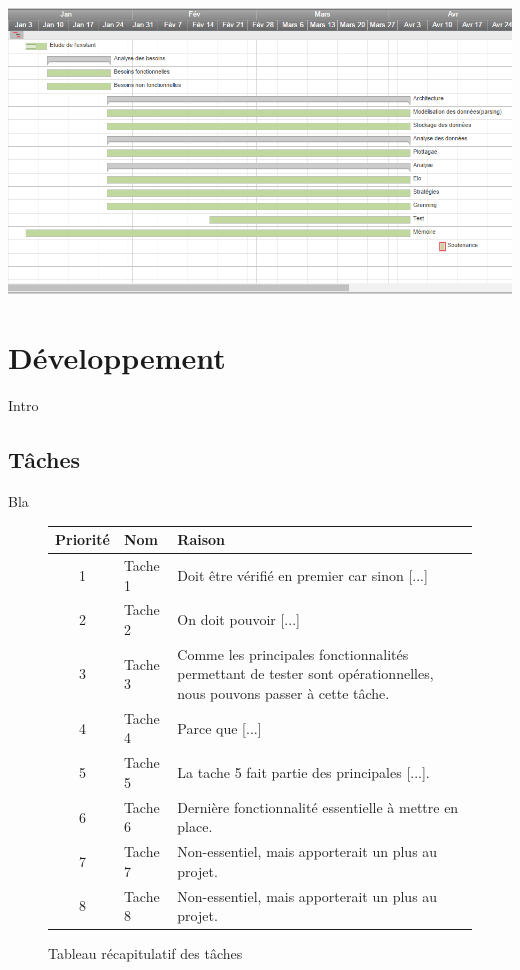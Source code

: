 \includegraphics[scale=0.45,keepaspectratio]{gantt}\\

\newpage

\section{Développement}

Intro

\subsection{Tâches}

Bla\\


\begin{figure}[!h]
\begin{center}
\begin{tabularx}{17cm}{|c|p{6cm}|X|}
  \hline
  Priorité & Nom & Raison\\
  \hline
  1 & Tache 1 & Doit être vérifié en premier car sinon [...] \tabularnewline
  2 & Tache 2 & On doit pouvoir [...] \tabularnewline
  3 & Tache 3 & Comme les principales fonctionnalités permettant de tester sont opérationnelles, nous pouvons passer à cette tâche. \tabularnewline
  4 & Tache 4 & Parce que [...] \tabularnewline
  5 & Tache 5 & La tache 5 fait partie des principales [...]. \tabularnewline
  6 & Tache 6 & Dernière fonctionnalité essentielle à mettre en place. \tabularnewline
  7 & Tache 7 & Non-essentiel, mais apporterait un plus au projet. \tabularnewline
  8 & Tache 8 & Non-essentiel, mais apporterait un plus au projet. \tabularnewline
  \hline
\end{tabularx}
\end{center}
\caption{Tableau récapitulatif des tâches}
\end{figure}

